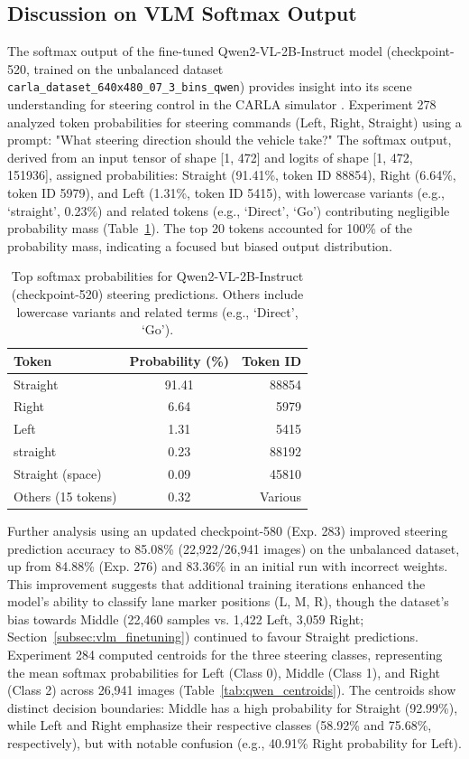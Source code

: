 \subsection{Discussion on VLM Softmax Output}
\label{subsec:vlm_softmax}

The softmax output of the fine-tuned Qwen2-VL-2B-Instruct model (checkpoint-520, trained on the unbalanced dataset \texttt{carla\_dataset\_640x480\_07\_3\_bins\_qwen}) provides insight into its scene understanding for steering control in the CARLA simulator \cite{carla}. Experiment 278 analyzed token probabilities for steering commands (Left, Right, Straight) using a prompt: "What steering direction should the vehicle take?" The softmax output, derived from an input tensor of shape [1, 472] and logits of shape [1, 472, 151936], assigned probabilities: Straight (91.41\%, token ID 88854), Right (6.64\%, token ID 5979), and Left (1.31\%, token ID 5415), with lowercase variants (e.g., `straight', 0.23\%) and related tokens (e.g., `Direct', `Go') contributing negligible probability mass (Table~\ref{tab:qwen_softmax}). The top 20 tokens accounted for 100\% of the probability mass, indicating a focused but biased output distribution.

\begin{table}[ht]
\centering
\begin{tabular}{@{}lcr@{}}
\toprule
Token & Probability (\%) & Token ID \\
\midrule
Straight & 91.41 & 88854 \\
Right & 6.64 & 5979 \\
Left & 1.31 & 5415 \\
straight & 0.23 & 88192 \\
Straight (space) & 0.09 & 45810 \\
Others (15 tokens) & 0.32 & Various \\
\bottomrule
\end{tabular}
\caption{Top softmax probabilities for Qwen2-VL-2B-Instruct (checkpoint-520) steering predictions. Others include lowercase variants and related terms (e.g., `Direct', `Go').}
\label{tab:qwen_softmax}
\end{table}

Further analysis using an updated checkpoint-580 (Exp. 283) improved steering prediction accuracy to 85.08\% (22,922/26,941 images) on the unbalanced dataset, up from 84.88\% (Exp. 276) and 83.36\% in an initial run with incorrect weights. This improvement suggests that additional training iterations enhanced the model’s ability to classify lane marker positions (L, M, R), though the dataset’s bias towards Middle (22,460 samples vs. 1,422 Left, 3,059 Right; Section~\ref{subsec:vlm_finetuning}) continued to favour Straight predictions. Experiment 284 computed centroids for the three steering classes, representing the mean softmax probabilities for Left (Class 0), Middle (Class 1), and Right (Class 2) across 26,941 images (Table~\ref{tab:qwen_centroids}). The centroids show distinct decision boundaries: Middle has a high probability for Straight (92.99\%), while Left and Right emphasize their respective classes (58.92\% and 75.68\%, respectively), but with notable confusion (e.g., 40.91\% Right probability for Left).

